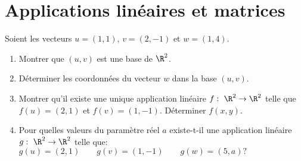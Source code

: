\documentclass[a4paper, 11pt,reqno]{article}
\begin{document}
% 
\vspace*{1cm}

\noindent\section{\large{Applications lin\'eaires et matrices}}

\begin{exercice}  \;
	Soient les vecteurs $u=(1,1)$, $v=(2,-1)$ et $w=(1,4)$.
	\begin{enumerate}
		\item Montrer que $(u,v)$ est une base de $\R^2$.
		\item D\'eterminer les coordonn\'ees du vecteur $w$ dans la base $(u,v)$.
		\item Montrer qu'il existe une unique application lin\'eaire $f:\ \R^2\rightarrow \R^2$ telle que $f(u)=(2,1)$ et $f(v)=(1,-1).$ D\'eterminer $f(x,y)$.
		\item Pour quelles valeurs du param\`etre r\'eel $a$ existe-t-il une application lin\'eaire $g:\ \R^2\rightarrow \R^2$ telle que: $g(u)=(2,1)\qquad g(v)=(1,-1)\qquad g(w)=(5,a) ?$
	\end{enumerate}
\end{exercice}
\end{document}
